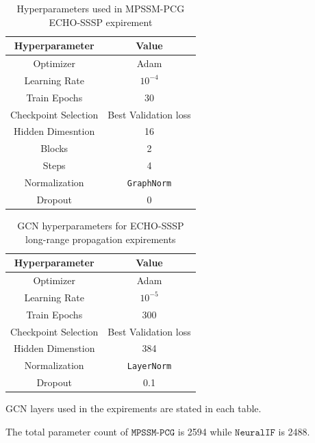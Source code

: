 \begin{table}[H]
    \centering
    \caption{Hyperparameters used in MPSSM-PCG ECHO-SSSP expirement}
    \small
    \begin{tabular}{c c}
        Hyperparameter       & Value                \\
        \hline
        Optimizer            & Adam                 \\
        Learning Rate        & $10^{-4}$            \\
        Train Epochs         & 30                   \\
        Checkpoint Selection & Best Validation loss \\
        Hidden Dimesntion    & 16                   \\
        Blocks               & 2                    \\
        Steps                & 4                    \\
        Normalization        & \texttt{GraphNorm}   \\
        Dropout              & 0                    \\
    \end{tabular}
\end{table}

\begin{table}[H]
    \centering
    \caption{GCN hyperparameters for ECHO-SSSP long-range propagation expirements}
    \small
    \begin{tabular}{c c}
        Hyperparameter       & Value                \\
        \hline
        Optimizer            & Adam                 \\
        Learning Rate        & $10^{-5}$            \\
        Train Epochs         & 300                  \\
        Checkpoint Selection & Best Validation loss \\
        Hidden Dimenstion    & 384                  \\
        Normalization        & \texttt{LayerNorm}   \\
        Dropout              & 0.1                  \\
    \end{tabular}
\end{table}

GCN layers used in the expirements are stated in each table.

The total parameter count of $\texttt{MPSSM-PCG}$ is 2594 while $\texttt{NeuralIF}$ is 2488.

